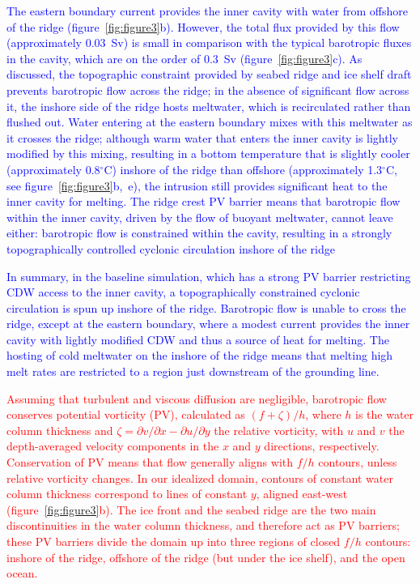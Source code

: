 \documentclass[draft]{agujournal2019}
\newcommand{\red}[1]{\textcolor{red}{#1}}
\newcommand{\blue}[1]{\textcolor{blue}{#1}}
\begin{document}
\blue{The eastern boundary current provides the inner cavity with water from offshore of the ridge (figure~\ref{fig:figure3}b). However, the total flux provided by this flow (approximately 0.03~Sv) is small in comparison with the typical barotropic fluxes in the cavity, which are on the order of 0.3~Sv  (figure~\ref{fig:figure3}c). As discussed, the topographic constraint provided by seabed ridge and ice shelf draft prevents barotropic flow across the ridge; in the absence of significant flow across it, the inshore side of the ridge hosts meltwater, which is recirculated rather than flushed out. Water entering at the eastern boundary mixes with this meltwater as it crosses the ridge; although warm water that enters the inner cavity is lightly modified by this mixing, resulting in a bottom temperature that is slightly cooler (approximately 0.8${}^\circ$C) inshore of the ridge than offshore (approximately 1.3${}^\circ$C, see figure~\ref{fig:figure3}b,~e), the intrusion still provides significant heat to the inner cavity for melting.  The ridge crest PV barrier means that barotropic flow within the inner cavity, driven by the flow of buoyant meltwater, cannot leave either: barotropic flow is constrained within the cavity, resulting in a strongly topographically controlled cyclonic circulation inshore of the ridge}

\blue{In summary, in the baseline simulation, which has a strong PV barrier restricting CDW access to the inner cavity, a topographically constrained cyclonic circulation is spun up inshore of the ridge. Barotropic flow is unable to cross the ridge, except at the eastern boundary, where a modest current provides the inner cavity with lightly modified CDW and thus a source of heat for melting. The hosting of cold meltwater on the inshore of the ridge means that melting high melt rates are restricted to a region just downstream of the grounding line.}


\red{Assuming that turbulent and viscous diffusion are negligible, barotropic flow conserves potential vorticity (PV),  calculated as $(f + \zeta)/h$, where $h$ is the water column thickness and $\zeta = \partial v / \partial x - \partial u / \partial y$ the relative vorticity, with $u$ and $v$ the depth-averaged velocity components in the $x$ and $y$ directions, respectively. Conservation of PV means that flow generally aligns with $f/h$ contours, unless relative vorticity changes. In our idealized domain, contours of constant water column thickness correspond to lines of constant $y$, aligned east-west (figure~\ref{fig:figure3}b). The ice front and the seabed ridge are the two main discontinuities in the water column thickness, and therefore act as PV barriers; these PV barriers divide the domain up into three regions of closed $f/h$ contours: inshore of the ridge, offshore of the ridge (but under the ice shelf), and the open ocean.}
\end{document}
